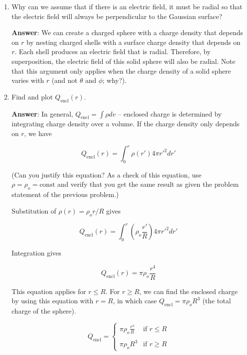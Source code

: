 \documentclass{article}
\newcommand{\ds}[0]{\displaystyle}
\begin{document}
\begin{enumerate}

  \item Why can we assume that if there is an electric field, it must be radial so that the electric field will always be perpendicular to the Gaussian surface?

        \ifsolutions
        \textbf{Answer}: We can create a charged sphere with a charge density that depends on $r$ by nesting charged shells with a surface charge density that depends on $r$. Each shell produces an electric field that is radial. Therefore, by superposition, the electric field of this solid sphere will also be radial. Note that this argument only applies when the charge density of a solid sphere varies with $r$ (and not $\theta$ and $\phi$; why?).
        \else
        \vskip 96pt
        \fi

  \item Find and plot $Q_{\text{encl}}(r)$.

        \ifsolutions
        \textbf{Answer}: In general, $Q_{\text{encl}} = \int \rho dv$ -- enclosed charge is determined by integrating charge density over a volume. If the charge density only depends on $r$, we have

        $$Q_{\text{encl}}(r) = \int_0^r \rho(r') 4\pi r'^2 dr'$$

        (Can you justify this equation? As a check of this equation, use $\rho=\rho_o=\text{const}$ and verify that you get the same result as given the problem statement of the previous problem.)

        Substitution of $\rho(r) = \rho_o r/R$ gives

        $$Q_{\text{encl}}(r) = \int_0^r \left(\rho_o\frac{r'}{R}\right)4\pi r'^2 dr'$$

        Integration gives

        $$Q_{\text{encl}}(r) =\pi\rho_o\frac{r^4}{R}$$

        This equation applies for $r\le R$. For $r\ge R$, we can find the enclosed charge by using this equation with $r=R$, in which case $Q_{\text{encl}}=\pi\rho_oR^3$ (the total charge of the sphere).

        $$
        Q_{\text{encl}} = \begin{cases}
          \ds\pi\rho_o\frac{r^4}{R} &\text{if  }r \le R \\\\
          \pi\rho_oR^3 &\text{if  }r \ge R
        \end{cases}
        $$


\end{enumerate}
\end{document}
